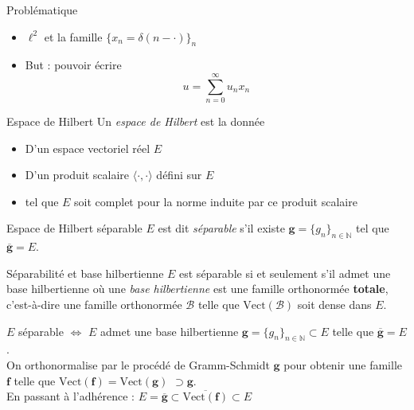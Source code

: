 \documentclass[french]{beamer}
\begin{document}
\begin{frame}{Problématique}
	\begin{itemize}
		\item<1-> $\ell^2$ et la famille $\{x_n = \delta(n - \cdot)\}_n$
		\item<2-> But : pouvoir écrire $$u = \sum_{n = 0}^{\infty} u_n x_n$$
	\end{itemize}
\end{frame}

\begin{frame}{Espace de Hilbert}
	Un \textit{espace de Hilbert} est la donnée
	\pause
	\begin{itemize}
		\item D'un espace vectoriel réel $E$ \pause
		\item D'un produit scalaire $\langle \cdot, \cdot \rangle$ défini sur $E$ \pause
		\item tel que $E$ soit complet pour la norme induite par ce produit scalaire
	\end{itemize}
\end{frame}

\begin{frame}{Espace de Hilbert séparable}
	$E$ est dit \textit{séparable} s'il existe $\mathbf{g} = \{g_n\}_{n \in \mathbb{N}}$ tel que $\overline{\mathbf{g}} = E$.
\end{frame}

\begin{frame}{Séparabilité et base hilbertienne}
	$E$ est séparable si et seulement s'il admet une base hilbertienne
	\pause
	où une \textit{base hilbertienne} est une famille orthonormée \textbf{totale}, c'est-à-dire une famille orthonormée $\mathcal{B}$ telle que $\text{Vect}(\mathcal{B})$ soit dense dans $E$.
\end{frame}

\begin{frame}{$E$ séparable $\Longleftrightarrow$ $E$ admet une base hilbertienne}
	$\mathbf{g} = \{g_n\}_{n \in \mathbb{N}} \subset E$ telle que $\overline{\mathbf{g}} = E$.\\
	\pause
	On orthonormalise par le procédé de Gramm-Schmidt $\mathbf{g}$ pour obtenir une famille $\mathbf{f}$ telle que $\text{Vect}(\mathbf{f}) = \text{Vect}(\mathbf{g})$ \pause $\supset \mathbf{g}$. \\
	\pause
	En passant à l'adhérence : $E = \overline{\mathbf{g}} \subset \overline{\text{Vect}(\mathbf{f})} \subset E$
\end{frame}
\end{document}
